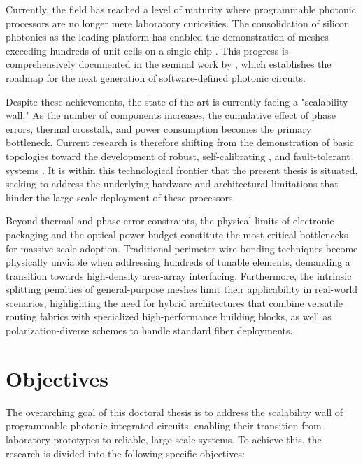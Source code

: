 Currently, the field has reached a level of maturity where programmable photonic processors are no
longer mere laboratory curiosities. The consolidation of silicon photonics as the leading platform 
has enabled the demonstration of meshes exceeding hundreds of unit cells on a single chip 
\cite{harrisQuantumTransportSimulations2017}. This progress is comprehensively documented in the 
seminal work by \cite{capmanyProgrammableIntegratedPhotonics2020}, which establishes the roadmap 
for the next generation of software-defined photonic circuits. 

Despite these achievements, the state of the art is currently facing a "scalability wall." As the 
number of components increases, the cumulative effect of phase errors, thermal crosstalk, and power 
consumption becomes the primary bottleneck. Current research is therefore shifting from the 
demonstration of basic topologies toward the development of robust, self-calibrating 
\cite{lopez-hernandezAutomaticSelfcalibrationProgrammable2022}, and fault-tolerant systems 
\cite{millerSelfconfiguringUniversalLinear2013,annoniUnscramblingLightAutomatically2017}. It is 
within this technological frontier that the present thesis is situated, seeking to address the 
underlying hardware and architectural limitations that hinder the large-scale deployment of these 
processors.

Beyond thermal and phase error constraints, the physical limits of electronic packaging and the 
optical power budget constitute the most critical bottlenecks for massive-scale adoption. 
Traditional perimeter wire-bonding techniques become physically unviable when addressing hundreds 
of tunable elements, demanding a transition towards high-density area-array interfacing. 
Furthermore, the intrinsic splitting penalties of general-purpose meshes limit their applicability 
in real-world scenarios, highlighting the need for hybrid architectures that combine versatile 
routing fabrics with specialized high-performance building blocks, as well as polarization-diverse 
schemes to handle standard fiber deployments.

\section{Objectives} \label{sec:objectives}

The overarching goal of this doctoral thesis is to address the scalability wall of programmable 
photonic integrated circuits, enabling their transition from laboratory prototypes to reliable, 
large-scale systems. To achieve this, the research is divided into the following specific 
objectives:

